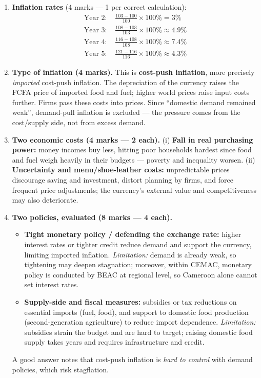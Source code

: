 \documentclass[11pt]{article}
\begin{document}
\begin{corrige}
\begin{enumerate}
\item \textbf{Inflation rates} (4 marks — 1 per correct calculation):
\begin{align*}
\text{Year 2: } & \frac{103-100}{100}\times 100\% = 3\% \\
\text{Year 3: } & \frac{108-103}{103}\times 100\% \approx 4.9\% \\
\text{Year 4: } & \frac{116-108}{108}\times 100\% \approx 7.4\% \\
\text{Year 5: } & \frac{121-116}{116}\times 100\% \approx 4.3\%
\end{align*}
\item \textbf{Type of inflation (4 marks).} This is \textbf{cost-push inflation}, more precisely \emph{imported} cost-push inflation. The depreciation of the currency raises the FCFA price of imported food and fuel; higher world prices raise input costs further. Firms pass these costs into prices. Since ``domestic demand remained weak'', demand-pull inflation is excluded — the pressure comes from the cost/supply side, not from excess demand.
\item \textbf{Two economic costs (4 marks — 2 each).} (i) \textbf{Fall in real purchasing power:} money incomes buy less, hitting poor households hardest since food and fuel weigh heavily in their budgets — poverty and inequality worsen. (ii) \textbf{Uncertainty and menu/shoe-leather costs:} unpredictable prices discourage saving and investment, distort planning by firms, and force frequent price adjustments; the currency's external value and competitiveness may also deteriorate.
\item \textbf{Two policies, evaluated (8 marks — 4 each).}
\begin{itemize}
\item \textbf{Tight monetary policy / defending the exchange rate:} higher interest rates or tighter credit reduce demand and support the currency, limiting imported inflation. \emph{Limitation:} demand is already weak, so tightening may deepen stagnation; moreover, within CEMAC, monetary policy is conducted by BEAC at regional level, so Cameroon alone cannot set interest rates.
\item \textbf{Supply-side and fiscal measures:} subsidies or tax reductions on essential imports (fuel, food), and support to domestic food production (second-generation agriculture) to reduce import dependence. \emph{Limitation:} subsidies strain the budget and are hard to target; raising domestic food supply takes years and requires infrastructure and credit.
\end{itemize}
A good answer notes that cost-push inflation is \emph{hard to control} with demand policies, which risk stagflation.
\end{enumerate}
\end{corrige}
\end{document}

